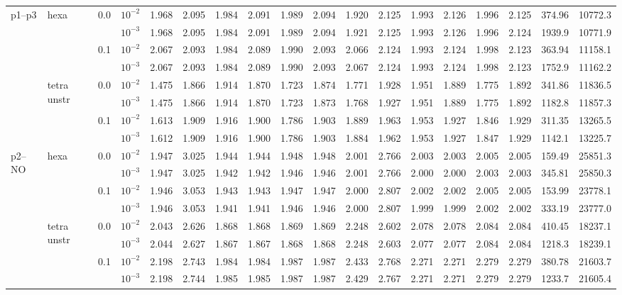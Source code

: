 \begin{longtable}{llclrrrrrrrrrrrrrr}
\multirow{8}{*}{p1--p3} & \multirow{4}{*}{hexa} & \multirow{2}{*}{0.0} & $10^{-2}$ & 1.968 & 2.095 & 1.984 & 2.091 & 1.989 & 2.094 & 1.920 & 2.125 & 1.993 & 2.126 & 1.996 & 2.125 & 374.96 & 10772.3 \\
& & & $10^{-3}$ & 1.968 & 2.095 & 1.984 & 2.091 & 1.989 & 2.094 & 1.921 & 2.125 & 1.993 & 2.126 & 1.996 & 2.124 & 1939.9 & 10771.9 \\\cline{3-18}
& & \multirow{2}{*}{0.1} & $10^{-2}$ & 2.067 & 2.093 & 1.984 & 2.089 & 1.990 & 2.093 & 2.066 & 2.124 & 1.993 & 2.124 & 1.998 & 2.123 & 363.94 & 11158.1 \\
& & & $10^{-3}$ & 2.067 & 2.093 & 1.984 & 2.089 & 1.990 & 2.093 & 2.067 & 2.124 & 1.993 & 2.124 & 1.998 & 2.123 & 1752.9 & 11162.2 \\\cline{2-18}
& \multirow{4}{*}{tetra unstr} & \multirow{2}{*}{0.0} & $10^{-2}$ & 1.475 & 1.866 & 1.914 & 1.870 & 1.723 & 1.874 & 1.771 & 1.928 & 1.951 & 1.889 & 1.775 & 1.892 & 341.86 & 11836.5 \\
& & & $10^{-3}$ & 1.475 & 1.866 & 1.914 & 1.870 & 1.723 & 1.873 & 1.768 & 1.927 & 1.951 & 1.889 & 1.775 & 1.892 & 1182.8 & 11857.3 \\\cline{3-18}
& & \multirow{2}{*}{0.1} & $10^{-2}$ & 1.613 & 1.909 & 1.916 & 1.900 & 1.786 & 1.903 & 1.889 & 1.963 & 1.953 & 1.927 & 1.846 & 1.929 & 311.35 & 13265.5 \\
& & & $10^{-3}$ & 1.612 & 1.909 & 1.916 & 1.900 & 1.786 & 1.903 & 1.884 & 1.962 & 1.953 & 1.927 & 1.847 & 1.929 & 1142.1 & 13225.7 \\\hline

\multirow{8}{*}{p2--NO} & \multirow{4}{*}{hexa} & \multirow{2}{*}{0.0} & $10^{-2}$ & 1.947 & 3.025 & 1.944 & 1.944 & 1.948 & 1.948 & 2.001 & 2.766 & 2.003 & 2.003 & 2.005 & 2.005 & 159.49 & 25851.3 \\
& & & $10^{-3}$ & 1.947 & 3.025 & 1.942 & 1.942 & 1.946 & 1.946 & 2.001 & 2.766 & 2.000 & 2.000 & 2.003 & 2.003 & 345.81 & 25850.3 \\\cline{3-18}
& & \multirow{2}{*}{0.1} & $10^{-2}$ & 1.946 & 3.053 & 1.943 & 1.943 & 1.947 & 1.947 & 2.000 & 2.807 & 2.002 & 2.002 & 2.005 & 2.005 & 153.99 & 23778.1 \\
& & & $10^{-3}$ & 1.946 & 3.053 & 1.941 & 1.941 & 1.946 & 1.946 & 2.000 & 2.807 & 1.999 & 1.999 & 2.002 & 2.002 & 333.19 & 23777.0 \\\cline{2-18}
& \multirow{4}{*}{tetra unstr} & \multirow{2}{*}{0.0} & $10^{-2}$ & 2.043 & 2.626 & 1.868 & 1.868 & 1.869 & 1.869 & 2.248 & 2.602 & 2.078 & 2.078 & 2.084 & 2.084 & 410.45 & 18237.1 \\
& & & $10^{-3}$ & 2.044 & 2.627 & 1.867 & 1.867 & 1.868 & 1.868 & 2.248 & 2.603 & 2.077 & 2.077 & 2.084 & 2.084 & 1218.3 & 18239.1 \\\cline{3-18}
& & \multirow{2}{*}{0.1} & $10^{-2}$ & 2.198 & 2.743 & 1.984 & 1.984 & 1.987 & 1.987 & 2.433 & 2.768 & 2.271 & 2.271 & 2.279 & 2.279 & 380.78 & 21603.7 \\
& & & $10^{-3}$ & 2.198 & 2.744 & 1.985 & 1.985 & 1.987 & 1.987 & 2.429 & 2.767 & 2.271 & 2.271 & 2.279 & 2.279 & 1233.7 & 21605.4 \\\hline


\end{longtable}
